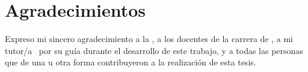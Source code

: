 \chapter*{Agradecimientos}

Expreso mi sincero agradecimiento a la \universidadTesis, a los docentes de la
carrera de \carreraTesis, a mi tutor/a \tutorTesis\ por su guía durante el
desarrollo de este trabajo, y a todas las personas que de una u otra forma
contribuyeron a la realización de esta tesis.
